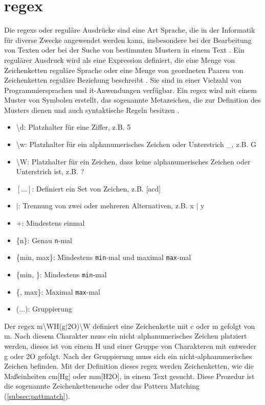 \section{\acs{regex}} \label{sec:regex}
Die \acfp{regex} oder reguläre Ausdrücke sind eine Art Sprache, die in der Informatik für diverse Zwecke angewendet werden kann, insbesondere bei der Bearbeitung von Texten oder bei der Suche von bestimmten Mustern in einem Text \cite{regexconf}. Ein regulärer Ausdruck wird als eine Expression definiert, die eine Menge von Zeichenketten \glqq reguläre Sprache\grqq{} oder eine Menge von geordneten Paaren von Zeichenketten \glqq reguläre Beziehung\grqq{} beschreibt \cite{regexhandbook}. Sie sind in einer Vielzahl von Programmiersprachen und \ac{it}-Anwendungen verfügbar. Ein \ac{regex} wird mit einem Muster von Symbolen erstellt, das sogenannte Metazeichen, die zur Definition des Musters dienen und auch syntaktische Regeln besitzen \cite{regexweb1}.

\begin{itemize}
	\item \textbackslash d: Platzhalter für eine Ziffer, z.B. 5
	\item \textbackslash w: Platzhalter für ein alphanumerisches Zeichen oder Unterstrich \glqq\_\grqq{}, z.B. G
	\item \textbackslash W: Platzhalter für ein Zeichen, dass keine alphanumerisches Zeichen oder Unterstrich ist, z.B. ?
	\item $[...]$: Definiert ein Set von Zeichen, z.B.  [acd]
	\item $\vert$:  Trennung von zwei oder mehreren Alternativen, z.B. x $\vert$ y
	\item +: Mindestens einmal
	\item \{n\}: Genau \texttt{n}-mal
	\item \{min, max\}: Mindestens \texttt{min}-mal und maximal \texttt{max}-mal	
	\item \{min, \}: Mindestens \texttt{min}-mal
	\item \{, max\}: Maximal \texttt{max}-mal
	\item (...): Gruppierung
\end{itemize}

Der \ac{regex} \glqq[cm]m\textbackslash WH(g$\vert$2O)\textbackslash W\grqq{} definiert eine Zeichenkette mit \glqq c\grqq{} oder \glqq m\grqq{} gefolgt von \glqq m\grqq{}. Nach diesem Charakter muss ein nicht alphanumerisches Zeichen platziert werden, dieses ist von einem \glqq H\grqq{} und  einer Gruppe von Charakteren mit entweder \glqq g\grqq{} oder \glqq 2O\grqq{} gefolgt. Nach der Gruppierung muss sich ein nicht-alphanumerisches Zeichen befinden. Mit der Definition dieses \ac{regex} werden Zeichenketten, wie die Maßeinheiten cm[Hg] oder mm[H2O], in einem Text gesucht. Diese Prozedur ist die sogenannte Zeichenkettensuche oder das Pattern Matching (\ref{subsec:pattmatch}).

